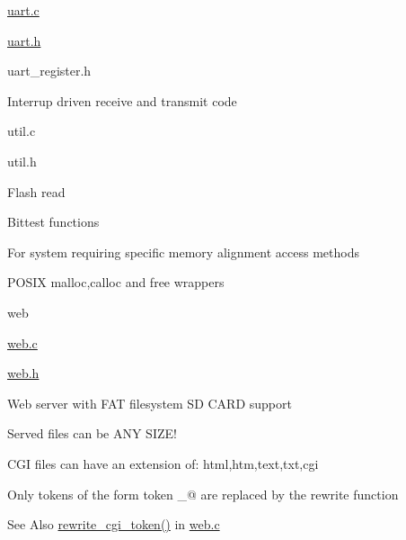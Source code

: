 \begin{DoxyItemize}
\begin{DoxyItemize}
\begin{DoxyItemize}
\end{DoxyItemize}
\item \hyperlink{uart_8c}{uart.\-c}
\item \hyperlink{uart_8h}{uart.\-h}
\item uart\-\_\-register.\-h
\begin{DoxyItemize}
\item Interrup driven receive and transmit code
\end{DoxyItemize}
\item util.\-c
\item util.\-h
\begin{DoxyItemize}
\item Flash read
\item Bittest functions
\begin{DoxyItemize}
\item For system requiring specific memory alignment access methods
\end{DoxyItemize}
\item P\-O\-S\-I\-X malloc,calloc and free wrappers
\end{DoxyItemize}
\end{DoxyItemize}
\item web
\begin{DoxyItemize}
\item \hyperlink{web_8c}{web.\-c}
\item \hyperlink{web_8h}{web.\-h}
\begin{DoxyItemize}
\item Web server with F\-A\-T filesystem S\-D C\-A\-R\-D support
\item Served files can be A\-N\-Y S\-I\-Z\-E!
\item C\-G\-I files can have an extension of\-: html,htm,text,txt,cgi
\begin{DoxyItemize}
\item Only tokens of the form  token \-\_\-@ are replaced by the rewrite function
\begin{DoxyItemize}
\item \begin{DoxySeeAlso}{See Also}
\hyperlink{web_8h_abfb5be0ab21dfe56bc934a8965154384}{rewrite\-\_\-cgi\-\_\-token()} in \hyperlink{web_8c}{web.\-c}
\end{DoxySeeAlso}


\end{DoxyItemize}
\end{DoxyItemize}
\end{DoxyItemize}
\end{DoxyItemize}
\end{DoxyItemize}
